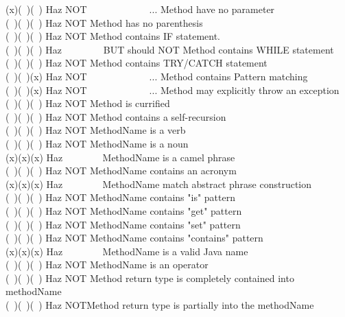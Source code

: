 \documentclass[12pt]{article}
\begin{document}
{(x)(\ )(\ ) \>Haz NOT\ \ \ \ \ \ \ \ \ \ \ \ \     ...       \>Method have no parameter\\
(\ )(\ )(\ ) \>Haz NOT                \>Method has no parenthesis\\
(\ )(\ )(\ ) \>Haz NOT                \>Method contains IF statement.\\
(\ )(\ )(\ ) \>Haz \ \ \ \ \ \ \ \ BUT should NOT Method contains WHILE statement\\
(\ )(\ )(\ ) \>Haz NOT                \>Method contains TRY/CATCH statement\\
(\ )(\ )(x) \>Haz NOT\ \ \ \ \ \ \ \ \ \ \ \ \ ...       \>Method contains Pattern matching\\
(\ )(\ )(x) \>Haz NOT\ \ \ \ \ \ \ \ \ \ \ \ \ ...       \>Method may explicitly throw an exception\\
(\ )(\ )(\ ) \>Haz NOT                \>Method is currified\\
(\ )(\ )(\ ) \>Haz NOT               \> Method contains a self-recursion\\
(\ )(\ )(\ ) \>Haz NOT               \> MethodName is a verb\\
(\ )(\ )(\ ) \>Haz NOT               \> MethodName is a noun\\
(x)(x)(x) \>Haz  \ \ \ \ \ \ \                    \> MethodName is a camel phrase\\
(\ )(\ )(\ ) \>Haz NOT               \> MethodName contains an acronym\\
(x)(x)(x) \>Haz  \ \ \ \ \ \ \                   \> MethodName match abstract phrase construction\\
(\ )(\ )(\ ) \>Haz NOT               \> MethodName contains "is" pattern\\
(\ )(\ )(\ ) \>Haz NOT                \>MethodName contains "get" pattern\\
(\ )(\ )(\ ) \>Haz NOT               \> MethodName contains "set" pattern\\
(\ )(\ )(\ ) \>Haz NOT              \> MethodName contains "contains" pattern\\
(x)(x)(x) \>Haz  \ \ \ \ \ \ \                   \> MethodName is a valid Java name\\
(\ )(\ )(\ ) \>Haz NOT               \> MethodName is an operator\\
(\ )(\ )(\ ) \>Haz NOT               \> Method return type is completely contained into methodName \\
(\ )(\ )(\ ) \>Haz NOT\>Method return type is partially into the methodName\\
}
\end{document}
